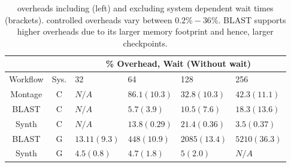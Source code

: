 \begin{table}[!t]
\centering
\begin{tabularx}{0.48\textwidth}{cc|XXXX}
\hline
& & \multicolumn{4}{c}{\% Overhead, Wait (Without wait)} \\ \hline
Workflow & Sys. & 32 & 64 & 128 & 256\\
\hline
Montage & C & $N/A$ & $86.1(10.3)$ &$32.8(10.3)$ & $42.3(11.1)$\\
BLAST & C & $N/A$ & $5.7(3.9)$ & $10.5(7.6)$ & $18.3(13.6)$\\
Synth& C & $N/A$ & $13.8(0.29)$ & $21.4(0.36)$ & $3.5(0.37)$\\
BLAST & G & $13.11(9.3)$ & $448(10.9)$ & $2085(13.4)$ & $5210(36.3)$\\
Synth & G & $4.5(0.8)$ & $4.7(1.8)$ & $5(2.0)$ & $N/A$\\
\hline
\end{tabularx}
\caption{
\small \systemname overheads including (left)
and excluding system dependent wait times (brackets).
 \systemname controlled overheads vary between $0.2 \% - 36\%$.
BLAST supports higher overheads due to its larger memory footprint and
hence, larger checkpoints.
}
\label{table:ehpc_overhead}
\vspace{-0.6cm}
\end{table}

